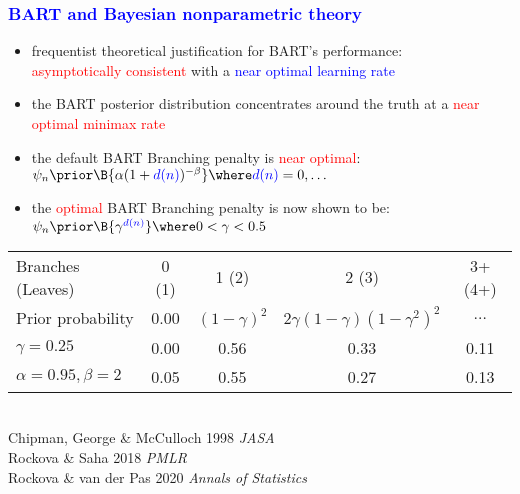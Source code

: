 \documentclass[11pt,dvipsnames,usenames,times]{beamer}
\begin{document}
\begin{frame}
\frametitle{\bf\textcolor{blue}{BART and Bayesian nonparametric theory}}
\boldmath

\begin{itemize}
\item frequentist theoretical justification for BART's performance:\\
\textcolor{red}{asymptotically consistent} with a 
\textcolor{blue}{near optimal learning rate}
\vspace*{0.1in}
\item 
the BART posterior distribution concentrates around the
truth at a \textcolor{red}{near optimal minimax rate}\\
\vspace*{0.1in}
\item 
the default BART Branching penalty is \textcolor{red}{near optimal}:\\
 $\psi_n \prior \B{\alpha (1+\textcolor{blue}{d(n)})^{-\beta}}
\where \textcolor{blue}{d(n)}=0, \dots$ 
\item 
the \textcolor{red}{optimal} BART Branching penalty is now shown to be:\\
 $\psi_n \prior \B{\gamma^{\textcolor{blue}{d(n)}}} \where 0<\gamma<0.5$ 
\end{itemize}
\begin{tabular}{lcccc}
Branches (Leaves) & 0 (1) & 1 (2) & 2 (3)  & 3+ (4+)  \\
Prior probability& 0.00 & $(1-\gamma)^2$ & $2\gamma(1-\gamma)(1-\gamma^2)^2$ &
$\dots$ \\ 
$\gamma=0.25$    & 0.00 & 0.56 & 0.33 & 0.11 \\
$\alpha=0.95, \beta=2$    & 0.05 & 0.55 & 0.27 & 0.13 \\
\end{tabular}\\
\vspace*{0.1in}
Chipman, George \& McCulloch 1998 {\it JASA}\\
Rockova \& Saha 2018 {\it PMLR}\\
Rockova \& van der Pas 2020 {\it Annals of Statistics}\\
\end{frame}
\end{document}
